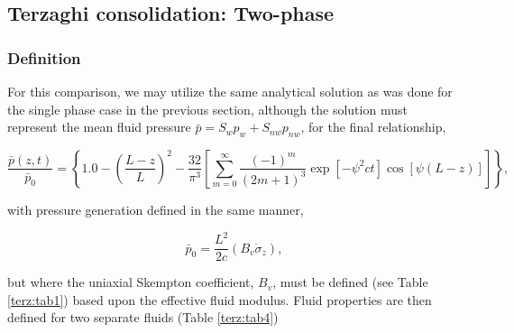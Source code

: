 \subsection{Terzaghi consolidation: Two-phase}
\subsubsection*{Definition}
For this comparison, we may utilize the same analytical solution as was done for the single phase case in the previous section, although the solution must represent the mean fluid pressure $\bar{p}=S_wp_w + S_{nw}p_{nw}$, for the final relationship,

\begin{equation}
\frac{\bar{p}\left( z,t \right)}{\bar{p}_0}=\left\{ 1.0-{{\left( \frac{L-z}{L} \right)}^{2}}-\frac{32}{{{\pi }^{3}}}\left[ \sum\limits_{m=0}^{\infty }{\frac{{{\left( -1 \right)}^{m}}}{{{\left( 2m+1 \right)}^{3}}}\exp \left[ -{{\psi }^{2}}ct \right]\cos \left[ \psi \left( L-z \right) \right]} \right] \right\},
\end{equation} 

with pressure generation defined in the same manner,

\begin{equation}
{{\bar{p}}_{0}}=\frac{{{L}^{2}}}{2c}\left( {{B}_{v}}{{{\dot{\sigma }}}_{z}} \right),
\end{equation}

but where the uniaxial Skempton coefficient, ${B}_{v}$, must be defined (see Table \ref{terz:tab1}) based upon the effective fluid modulus. Fluid properties are then defined for two separate fluids (Table \ref{terz:tab4})

